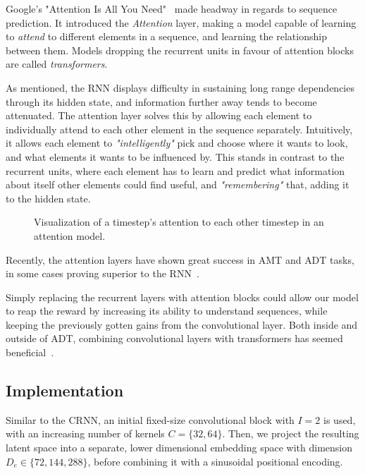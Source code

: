 Google's "Attention Is All You Need"~\cite{NIPS2017_3f5ee243} made headway in regards to sequence prediction. It introduced the \textit{Attention} layer, making a model capable of learning to \textit{attend} to different elements in a sequence, and learning the relationship between them. Models dropping the recurrent units in favour of attention blocks are called \textit{transformers}.

As mentioned, the \gls{RNN} displays difficulty in sustaining long range dependencies through its hidden state, and information further away tends to become attenuated. The attention layer solves this by allowing each element to individually attend to each other element in the sequence separately. Intuitively, it allows each element to \textit{"intelligently"} pick and choose where it wants to look, and what elements it wants to be influenced by. This stands in contrast to the recurrent units, where each element has to learn and predict what information about itself other elements could find useful, and \textit{"remembering"} that, adding it to the hidden state.

\begin{figure}[H]
    \centering
    
    \caption{Visualization of a timestep's attention to each other timestep in an attention model.}
    \label{CTInfluenceFigure}
\end{figure}


Recently, the attention layers have shown great success in \gls{AMT} and \gls{ADT} tasks, in some cases proving superior to the \gls{RNN}~\cite{gardner2022mt3multitaskmultitrackmusic, chang2024yourmt3multiinstrumentmusictranscription, zehren2024analyzingreducingsynthetictorealtransfer}.

Simply replacing the recurrent layers with attention blocks could allow our model to reap the reward by increasing its ability to understand sequences, while keeping the previously gotten gains from the convolutional layer. Both inside and outside of \gls{ADT}, combining convolutional layers with transformers has seemed beneficial~\cite{zehren2024analyzingreducingsynthetictorealtransfer, gulati2020conformerconvolutionaugmentedtransformerspeech}.

\subsection{Implementation}

Similar to the \gls{CRNN}, an initial fixed-size convolutional block with $I = 2$ is used, with an increasing number of kernels $C = \{32, 64\}$. Then, we project the resulting latent space into a separate, lower dimensional embedding space with dimension $D_e \in \{72, 144, 288\}$, before combining it with a sinusoidal positional encoding. 

